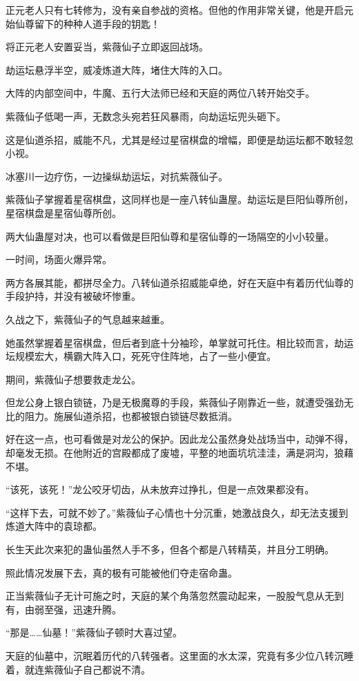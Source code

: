 \begin{this_body}
正元老人只有七转修为，没有亲自参战的资格。但他的作用非常关键，他是开启元始仙尊留下的种种人道手段的钥匙！

将正元老人安置妥当，紫薇仙子立即返回战场。

劫运坛悬浮半空，威凌炼道大阵，堵住大阵的入口。

大阵的内部空间中，牛魔、五行大法师已经和天庭的两位八转开始交手。

紫薇仙子低喝一声，无数念头宛若狂风暴雨，向劫运坛兜头砸下。

这是仙道杀招，威能不凡，尤其是经过星宿棋盘的增幅，即便是劫运坛都不敢轻忽小视。

冰塞川一边疗伤，一边操纵劫运坛，对抗紫薇仙子。

紫薇仙子掌握着星宿棋盘，这同样也是一座八转仙蛊屋。劫运坛是巨阳仙尊所创，星宿棋盘是星宿仙尊所创。

两大仙蛊屋对决，也可以看做是巨阳仙尊和星宿仙尊的一场隔空的小小较量。

一时间，场面火爆异常。

两方各展其能，都拼尽全力。八转仙道杀招威能卓绝，好在天庭中有着历代仙尊的手段护持，并没有被破坏惨重。

久战之下，紫薇仙子的气息越来越重。

她虽然掌握着星宿棋盘，但后者到底十分袖珍，单掌就可托住。相比较而言，劫运坛规模宏大，横霸大阵入口，死死守住阵地，占了一些小便宜。

期间，紫薇仙子想要救走龙公。

但龙公身上银白锁链，乃是无极魔尊的手段，紫薇仙子刚靠近一些，就遭受强劲无比的阻力。施展仙道杀招，也都被银白锁链尽数抵消。

好在这一点，也可看做是对龙公的保护。因此龙公虽然身处战场当中，动弹不得，却毫发无损。在他附近的宫殿都成了废墟，平整的地面坑坑洼洼，满是洞沟，狼藉不堪。

“该死，该死！”龙公咬牙切齿，从未放弃过挣扎，但是一点效果都没有。

“这样下去，可就不妙了。”紫薇仙子心情也十分沉重，她激战良久，却无法支援到炼道大阵中的袁琼都。

长生天此次来犯的蛊仙虽然人手不多，但各个都是八转精英，并且分工明确。

照此情况发展下去，真的极有可能被他们夺走宿命蛊。

正当紫薇仙子无计可施之时，天庭的某个角落忽然震动起来，一股股气息从无到有，由弱至强，迅速升腾。

“那是……仙墓！”紫薇仙子顿时大喜过望。

天庭的仙墓中，沉眠着历代的八转强者。这里面的水太深，究竟有多少位八转沉睡着，就连紫薇仙子自己都说不清。


\end{this_body}
